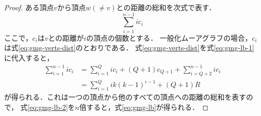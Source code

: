 \begin{proof}
  ある頂点$v$から頂点$w(\neq v)$との距離の総和を次式で表す．
  \begin{equation}
    \label{eq:gmg-lb-1}
    \sum_{i=1}^{n-1}i c_i
  \end{equation}
  ここで，$c_i$は$v$との距離が$i$の頂点の個数とする．
  一般化ムーアグラフの場合，$c_i$は式\ref{eq:gmg-verts-dist}のとおりである．
  式\ref{eq:gmg-verts-dist}を式\ref{eq:gmg-lb-1}に代入すると，
  \begin{align}
      \sum_{i=1}^{n-1}ic_i
      &=\sum_{i=1}^{Q}ic_i+(Q+1)c_{Q+1}+\sum_{i=Q+2}^{n-1}ic_i \nonumber\\
      &=\sum_{i=1}^{Q}ik(k-1)^{i-1}+(Q+1)R
      \label{eq:gmg-lb-2}
  \end{align}
  が得られる．これは一つの頂点から他のすべての頂点への距離の総和を表すので，
  式\ref{eq:gmg-lb-2}を$n$倍すると，式\ref{eq:gmg-lb}が得られる．


\end{proof}
